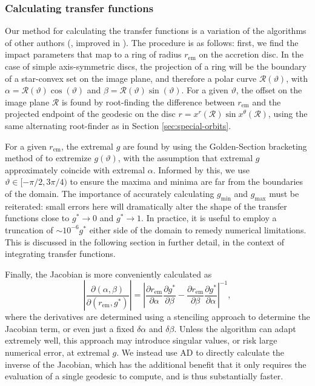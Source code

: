 \documentclass[fleqn,usenatbib]{mnras}
\newcommand{\pderiv}[2]{\frac{\partial #1}{\partial #2}}
\begin{document}
\subsubsection{Calculating transfer functions}

Our method for calculating the transfer functions is a variation of the algorithms of other authors (\citealp{speith_photon_1995,bambi_testing_2017}, improved in \citealp{abdikamalov_public_2019}). The procedure is as follows: first, we find the impact parameters that map to a ring of radius $r_\text{em}$ on the accretion disc. In the case of simple axis-symmetric discs, the projection of a ring will be the boundary of a star-convex set on the image plane, and therefore a polar curve $\mathcal{R}(\vartheta)$, with $\alpha = \mathcal{R}(\vartheta) \cos(\vartheta)$ and $\beta = \mathcal{R}(\vartheta) \sin(\vartheta)$. For a given $\vartheta$, the offset on the image plane $\mathcal{R}$ is found by root-finding the difference between $r_\text{em}$ and the projected endpoint of the geodesic on the disc $r = x^r (\mathcal{R}) \sin x^\theta(\mathcal{R})$, using the same alternating root-finder as in Section \ref{sec:special-orbits}.

For a given $r_\text{em}$, the extremal $g$ are found by using the Golden-Section bracketing method of \cite{optimize.jl} to extremize $g(\vartheta)$, with the assumption that extremal $g$ approximately coincide with extremal $\alpha$. Informed by this, we use $\vartheta \in [ -\pi/2, 3\pi/4 )$ to ensure the maxima and minima are far from the boundaries of the domain. The importance of accurately calculating $g_\text{min}$ and $g_\text{max}$ must be reiterated: small errors here will dramatically alter the shape of the transfer functions close to $g^\ast \rightarrow 0$ and $g^\ast \rightarrow 1$. In practice, it is useful to employ a truncation of $\sim 10^{-6}g^\ast$ either side of the 
domain to remedy numerical limitations. This is discussed in the following section in further detail, in the context of integrating transfer functions.

Finally, the Jacobian is more conveniently calculated as
\begin{equation}
    \left\lvert 
    \pderiv{(\alpha, \beta)}{(r_\text{em}, g^\ast)} 
    \right\rvert
    =
    \left\lvert
    \pderiv{r_\text{em}}{\alpha}\pderiv{g^\ast}{\beta}
    -
    \pderiv{r_\text{em}}{\beta}\pderiv{g^\ast}{\alpha}
    \right\rvert^{-1},
\end{equation}
where the derivatives are determined using a stenciling approach to determine the Jacobian term, or even just a fixed $\delta \alpha$ and $\delta \beta$. Unless the algorithm can adapt extremely well, this approach may introduce singular values, or risk large numerical error, at extremal $g$. We instead use AD to directly calculate the inverse of the Jacobian, which has the additional benefit that it only requires the evaluation of a single geodesic to compute, and is thus substantially faster. 
\end{document}
